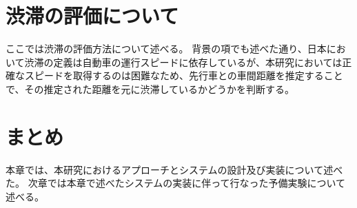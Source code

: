 \section{渋滞の評価について}
ここでは渋滞の評価方法について述べる。
背景の項でも述べた通り、日本において渋滞の定義は自動車の運行スピードに依存しているが、本研究においては正確なスピードを取得するのは困難なため、先行車との車間距離を推定することで、その推定された距離を元に渋滞しているかどうかを判断する。

\section{まとめ}
本章では、本研究におけるアプローチとシステムの設計及び実装について述べた。
次章では本章で述べたシステムの実装に伴って行なった予備実験について述べる。